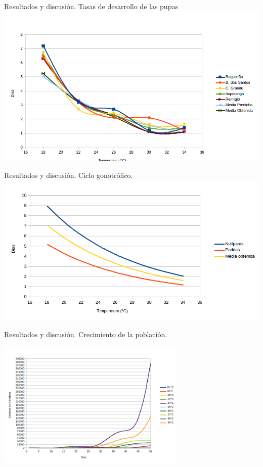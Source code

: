 \begin{frame}[c]{Resultados y discusión. Tasas de desarrollo de las pupas}
    \includegraphics[width=\textwidth]{./graphics/pupas-desarrollo.png}
\end{frame}

\begin{frame}[t]{Resultados y discusión. Ciclo gonotrófico.}
    \includegraphics[width=\textwidth]{./graphics/ciclo-gonotrofico-temperatura.png}
\end{frame}


\begin{frame}[t]{Resultados y discusión. Crecimiento de la población.}
\begin{center}
    \includegraphics[width=9cm]{../paper/graphics/evolucion-poblacion-all.png}
\end{center}
\end{frame}


